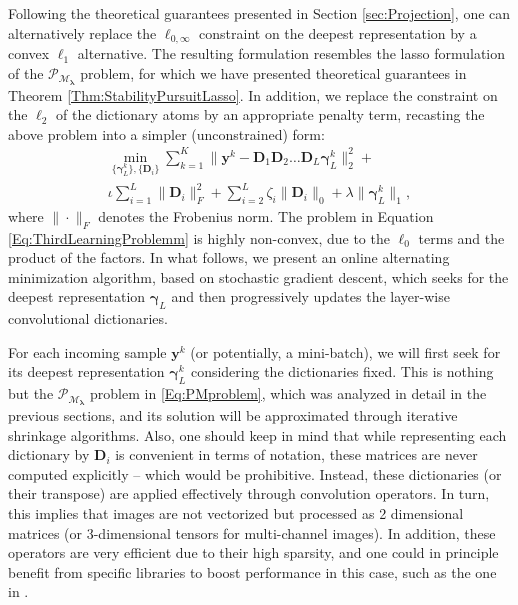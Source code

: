 \documentclass[10pt,journal]{IEEEtran}
\def\y{{\mathbf y}}
\def\D{{\mathbf D}}
\def\M{{\mathcal{M}}}
\def\P{{\mathcal{P}}}
\def\gama{{\boldsymbol \gamma}}
\def\lamda{{\boldsymbol \lambda}}
\def\Loi{{\ell_{0,\infty}}}
\def\PM{{\P_{\M_\lamda}}}
\theoremstyle{plain}
\theoremstyle{definition}
\begin{document}
Following the theoretical guarantees presented in Section \ref{sec:Projection}, one can alternatively replace the $\Loi$ constraint on the deepest representation by a convex $\ell_1$ alternative. The resulting formulation resembles the lasso formulation of the $\PM$ problem, for which we have presented theoretical guarantees in Theorem \ref{Thm:StabilityPursuitLasso}. In addition, we replace the constraint on the $\ell_2$ of the dictionary atoms by an appropriate penalty term, recasting the above problem into a simpler (unconstrained) form: 
\begin{multline}
	\min_{\{\gama^k_L\},\{\D_i\}} \sum_{k=1}^K \| \y^k - \D_1\D_2\dots\D_L \gama^k_L \|^2_2 +\\ \iota \sum_{i=1}^L \|\D_i\|^2_F + \sum_{i=2}^L \zeta_i \|\D_i\|_0 + \lambda \|\gama^k_L\|_1,
\label{Eq:ThirdLearningProblemm}
\end{multline}
where $\|\cdot\|_F$ denotes the Frobenius norm.
The problem in Equation \eqref{Eq:ThirdLearningProblemm} is highly non-convex, due to the $\ell_0$ terms and the product of the factors. In what follows, we present an online alternating minimization algorithm, based on stochastic gradient descent, which seeks for the deepest representation $\gama_L$ and then progressively updates the layer-wise convolutional dictionaries.

For each incoming sample $\y^k$ (or potentially, a mini-batch), we will first seek for its deepest representation $\gama^k_L$ considering the dictionaries fixed. This is nothing but the $\PM$ problem in \eqref{Eq:PMproblem}, which was analyzed in detail in the previous sections, and its solution will be approximated through iterative shrinkage algorithms. Also, one should keep in mind that while representing each dictionary by $\D_i$ is convenient in terms of notation, these matrices are never computed explicitly -- which would be prohibitive. Instead, these dictionaries (or their transpose) are applied effectively through convolution operators. In turn, this implies that images are not vectorized but processed as 2 dimensional matrices (or 3-dimensional tensors for multi-channel images). In addition, these operators are very efficient due to their high sparsity, and one could in principle benefit from specific libraries to boost performance in this case, such as the one in \cite{liu2015sparse}.
\end{document}
